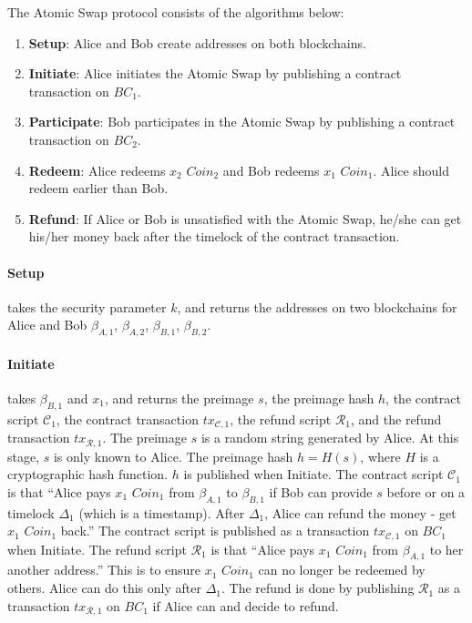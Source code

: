 The Atomic Swap protocol consists of the algorithms below:

\begin{enumerate}
    \item \textbf{Setup}: Alice and Bob create addresses on both blockchains.
    \item \textbf{Initiate}: Alice initiates the Atomic Swap by publishing a contract transaction on $BC_1$.
    \item \textbf{Participate}: Bob participates in the Atomic Swap by publishing a contract transaction on $BC_2$.
    \item \textbf{Redeem}: Alice redeems $x_2$ $Coin_2$ and Bob redeems $x_1$ $Coin_1$. Alice should redeem earlier than Bob.
    \item \textbf{Refund}: If Alice or Bob is unsatisfied with the Atomic Swap, he/she can get his/her money back after the timelock of the contract transaction.
\end{enumerate}

\paragraph{Setup}
takes the security parameter $k$,
and returns the addresses on two blockchains for Alice and Bob $\beta_{A, 1}$, $\beta_{A, 2}$, $\beta_{B, 1}$, $\beta_{B, 2}$.

\paragraph{Initiate}
takes $\beta_{B, 1}$ and $x_1$,
and returns the preimage $s$, the preimage hash $h$, the contract script $\mathcal{C}_1$, the contract transaction $tx_{\mathcal{C}, 1}$, the refund script $\mathcal{R}_1$, and the refund transaction $tx_{\mathcal{R}, 1}$.
The preimage $s$ is a random string generated by Alice. At this stage, $s$ is only known to Alice.
The preimage hash $h = H(s)$, where $H$ is a cryptographic hash function.  $h$ is published when Initiate.
The contract script $\mathcal{C}_1$ is that ``Alice pays $x_1$ $Coin_1$ from $\beta_{A, 1}$ to $\beta_{B, 1}$ if Bob can provide $s$ before or on a timelock $\Delta_1$ (which is a timestamp). After $\Delta_1$, Alice can refund the money - get $x_1$ $Coin_1$ back.''
The contract script is published as a transaction $tx_{\mathcal{C}, 1}$ on $BC_1$ when Initiate.
The refund script $\mathcal{R}_1$ is that ``Alice pays $x_1$ $Coin_1$ from $\beta_{A, 1}$ to her another address.'' This is to ensure $x_1$ $Coin_1$ can no longer be redeemed by others. Alice can do this only after $\Delta_1$.
The refund is done by publishing $\mathcal{R}_1$ as a transaction $tx_{\mathcal{R}, 1}$ on $BC_1$ if Alice can and decide to refund.

